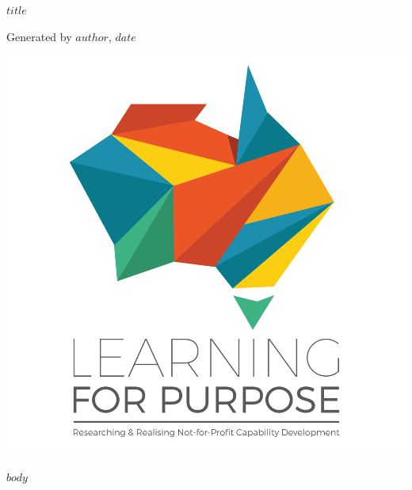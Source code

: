 \documentclass[11pt, a4paper]{article}
\begin{document}
\pagestyle{fancy}

\begin{titlepage}
	\centering
	
	{%
		\fontsize{30pt}{30pt}\selectfont
		$title$
	}%
	
	\vspace*{2\baselineskip}
	{\footnotesize Generated by $author$, $date$}
	
	\vspace*{5\baselineskip}
	
	\includegraphics[width=.75\textwidth]{LFP_vertical_tagline.png}
	
	\vspace*{\baselineskip}
	
	\tableofcontents
	
	\thispagestyle{empty}
\end{titlepage}

\onehalfspacing
\raggedright

$body$
\end{document}
